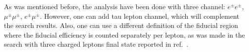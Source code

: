 As was mentioned before, the analysis have been done with three channel: $e^{\pm}e^{\pm}$, $\mu^{\pm}\mu^{\pm}$, $e^{\pm}\mu^{\pm}$. However, one can add tau lepton channel, which will complement the search results. Also, one can use a different definition of the fiducial region where the fiducial efficiency is counted separately per lepton, as was made in the search with three charged leptons final state reported in ref.~\cite{TheATLAScollaboration:2013cia}.



